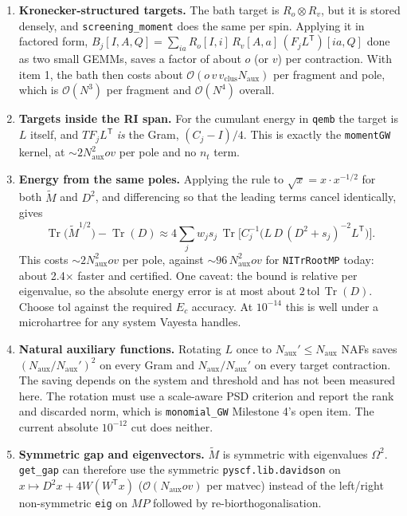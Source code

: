 \documentclass[11pt,a4paper]{article}
\newcommand{\code}[1]{\texttt{\small #1}}
\newcommand{\Naux}{N_{\mathrm{aux}}}
\newcommand{\nt}{n_{t}}
\newcommand{\ov}{ov}
\newcommand{\Mt}{\tilde{M}}
\newcommand{\Tr}{\operatorname{Tr}}
\begin{document}
\begin{enumerate}
        Keep the rational diagonal $\sum_j w_jF_j$ rather than replacing it by $I$. The callers
        subtract the bare target (\code{m0 - l\_}, \code{eta0 - lrot}), and the consistent
        diagonal makes that difference come out of the low-rank term alone instead of from a
        cancellation of two large numbers.
  \item \textbf{Kronecker-structured targets.} The bath target is $R_o\otimes R_v$, but it is
        stored densely, and \code{screening\_moment} does the same per spin. Applying it in
        factored form,
        $B_j[I,A,Q]=\sum_{ia}R_o[I,i]\,R_v[A,a]\,(F_jL^{\mathsf T})[ia,Q]$ done as two small
        GEMMs, saves a factor of about $o$ (or $v$) per contraction. With item 1, the bath then
        costs about $\mathcal{O}(o\,v\,v_{\mathrm{clus}}\Naux)$ per fragment and pole, which is
        $\mathcal{O}(N^3)$ per fragment and $\mathcal{O}(N^4)$ overall.
  \item \textbf{Targets inside the RI span.} For the cumulant energy in \code{qemb} the target is
        $L$ itself, and $TF_jL^{\mathsf T}$ \emph{is} the Gram, $(C_j-I)/4$. This is exactly the
        \code{momentGW} kernel, at ${\sim}2\Naux^2\ov$ per pole and no $\nt$ term.
  \item \textbf{Energy from the same poles.} Applying the rule to $\sqrt{x}=x\cdot x^{-1/2}$ for
        both $\Mt$ and $D^2$, and differencing so that the leading terms cancel identically, gives
        \begin{equation}
          \Tr\big(\Mt^{1/2}\big) - \Tr(D) \approx
          4\sum_j w_j s_j\,\Tr\!\Big[C_j^{-1}\big(L\,D\,(D^2+s_j)^{-2}L^{\mathsf T}\big)\Big].
        \end{equation}
        This costs ${\sim}2\Naux^2\ov$ per pole, against ${\sim}96\,\Naux^2\ov$ for
        \code{NITrRootMP} today: about 2.4$\times$ faster and certified. One caveat: the bound is
        relative per eigenvalue, so the absolute energy error is at most about
        $2\,\mathrm{tol}\,\Tr(D)$. Choose tol against the required $E_c$ accuracy. At
        $10^{-14}$ this is well under a microhartree for any system Vayesta handles.
  \item \textbf{Natural auxiliary functions.} Rotating $L$ once to $\Naux'\le\Naux$ NAFs saves
        $(\Naux/\Naux')^2$ on every Gram and $\Naux/\Naux'$ on every target contraction. The
        saving depends on the system and threshold and has not been measured here. The rotation
        must use a scale-aware PSD criterion and report the rank and discarded norm, which is
        \code{monomial\_GW} Milestone 4's open item. The current absolute $10^{-12}$ cut does
        neither.
  \item \textbf{Symmetric gap and eigenvectors.} $\Mt$ is symmetric with eigenvalues $\Omega^2$.
        \code{get\_gap} can therefore use the symmetric \code{pyscf.lib.davidson} on
        $x\mapsto D^2x + 4W(W^{\mathsf T}x)$ ($\mathcal{O}(\Naux\ov)$ per matvec) instead of the
        left/right non-symmetric \code{eig} on $MP$ followed by re-biorthogonalisation.
\end{enumerate}
\end{document}
